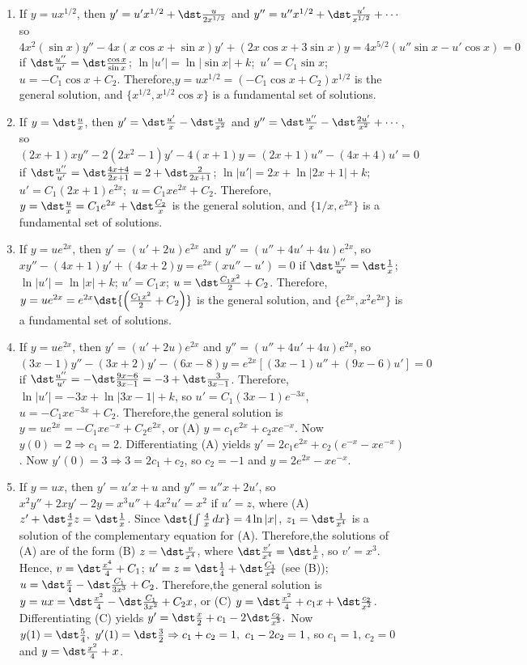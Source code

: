 \documentclass[openany]{book}
\newenvironment{sectionSolutions}{
 \begin{enumerate}[item-label={\thesection.\arabic{enumi}.}]
}{
 \end{enumerate}
}
\begin{document}
\begin{sectionSolutions}
\item
If $y=ux^{1/2}$, then $y'=u'x^{1/2}+\dst\frac{u}{2x^{1/2}}$ and
$y''=u''x^{1/2}+\dst\frac{u'}{ x^{1/2}}+\cdots$ so $4x^2(\sin
x)y''-4x(x\cos x+\sin x)y'+(2x\cos x+3\sin x)y=4x^{5/2}(u''\sin
x-u'\cos x)=0$ if $\dst\frac{u''}{ u'}=\dst\frac{\cos x}{\sin x}$;\;
$\ln|u'|=\ln|\sin x|+k$;\ $u'=C_1\sin x$;\ $u=-C_1\cos x+C_2$.
Therefore,$y=ux^{1/2}=(-C_1\cos x+C_2)x^{1/2}$ is the general
solution, and $\{x^{1/2},x^{1/2}\cos x\}$ is a fundamental set of
solutions.


\item
If $y=\dst\frac{u}{ x}$, then $y'=\dst\frac{u'}{ x}-\dst\frac{u}{ x^2}$ and
$y''=\dst\frac{u''}{ x}-\dst\frac{2u'}{ x^2}+\cdots$, so
$(2x+1)xy''-2(2x^2-1)y'-4(x+1)y=(2x+1)u''-(4x+4)u'=0$ if
$\dst\frac{u''}{ u'}=\dst\frac{4x+4}{2x+1}=2+\dst\frac{2}{2x+1}$;\;
$\ln|u'|=2x+\ln|2x+1|+k$; $u'=C_1(2x+1)e^{2x}$;\ $u=C_1xe^{2x}+C_2$.
Therefore,$y=\dst\frac{u}{ x}=C_1e^{2x}+\dst\frac{C_2}{ x}$ is the general
solution, and $\{1/x,e^{2x}\}$ is a fundamental set of solutions.


\item
If $y=ue^{2x}$, then $y'=(u'+2u)e^{2x}$ and $y''=(u''+4u'+4u)e^{2x}$,
so $xy''-(4x+1)y'+(4x+2)y =e^{2x}(xu''-u')=0$ if $\dst\frac{u''}{
u'}=\dst\frac{1}{ x}$;\ $\ln|u'|=\ln|x|+k$; $u'=C_1x$;\;
$u=\dst\frac{C_1x^2}{ 2}+C_2$. Therefore,
$y=ue^{2x}=e^{2x}\dst{\left(\frac{C_1x^2}{2}+C_2\right)}$ is the general
solution, and $\{e^{2x},x^2e^{2x}\}$ is a fundamental set of
solutions.




\item
If $y=ue^{2x}$, then $y'=(u'+2u)e^{2x}$ and $y''=(u''+4u'+4u)e^{2x}$,
so
$(3x-1)y''-(3x+2)y'-(6x-8)y=e^{2x}\left[(3x-1)u''+(9x-6)u'\right]=0$
if $\dst\frac{u''}{ u'}=-\dst\frac{9x-6}{3x-1}=-3+\dst\frac{3}{3x-1}$.
Therefore,$\ln|u'|=-3x+\ln|3x-1|+k$, so $u'=C_1(3x-1)e^{-3x}$,
$u=-C_1xe^{-3x}+C_2$. Therefore,the general solution is
$y=ue^{2x}=-C_1xe^{-x}+C_2e^{2x}$, or (A) $y=c_1e^{2x}+c_2xe^{-x}$.
Now $y(0)=2\Rightarrow c_1=2$. Differentiating (A) yields
$y'=2c_1e^{2x}+c_2(e^{-x}-xe^{-x})$. Now $y'(0)=3\Rightarrow
3=2c_1+c_2$, so $c_2=-1$ and $y=2e^{2x}-xe^{-x}$.


\item
If $y=ux$, then $y'=u'x+u$  and $y''=u''x+2u'$, so
$x^2y''+2xy'-2y=x^3u''+4x^2u'=x^2$
if $u'=z$, where  (A) $z'+\dst\frac{4}{ x}z=\dst\frac{1}{ x}$.
Since $\dst{\int\frac{4}{ x}\,dx}=4\ln|x|$,
$z_1=\dst\frac{1}{ x^4}$
is a solution of the complementary equation for  (A). Therefore,the
solutions of (A) are of the form (B) $z=\dst\frac{v}{ x^4}$, where
$\dst\frac{v'}{ x^4}=\dst\frac{1}{ x}$, so $v'=x^3$.
Hence, $v=\dst\frac{x^4}{ 4}+C_1$;\;
$u'=z=\dst\frac{1}{4}+\dst\frac{C_1}{ x^4}$ (see (B));\;
$u=\dst\frac{x}{4}-\dst\frac{C_1}{3x^3}+C_2$.
 Therefore,the general solution is
$y=ux=\dst\frac{x^2}{4}-\dst\frac{C_1}{3x^2}+C_2x$, or
(C) $y=\dst\frac{x^2}{4}+c_1x+\dst\frac{c_2}{ x^2}$.
Differentiating (C) yields
 $y'=\dst\frac{x}{2}+c_1-2\dst\frac{c_2}{ x^3}.$
Now $y(1)=\dst\frac{5}{4},\ y'(1)=\dst\frac{3}{2}\Rightarrow
c_1+c_2=1,\ c_1-2c_2=1$, so $c_1=1$, $c_2=0$ and
$y=\dst\frac{x^2}{4}+x$.





\end{sectionSolutions}
\end{document}
